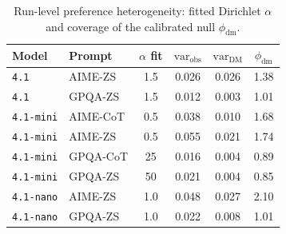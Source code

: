 \documentclass{article}
\begin{document}
\begin{table}[H]
\centering
\caption{Run-level preference heterogeneity: fitted Dirichlet $\alpha$ and coverage of the calibrated null $\phi_{\mathrm{dm}}$.}
\label{tab:dispersion}
\begin{tabular}{llcccc}
\toprule
Model & Prompt & $\alpha$ fit & $\mathrm{var}_{\mathrm{obs}}$ &
$\mathrm{var}_{\mathrm{DM}}$ & $\phi_{\mathrm{dm}}$ \\
\midrule
\texttt{4.1} & AIME-ZS & 1.5 & 0.026 & 0.026 & 1.38 \\
\texttt{4.1} & GPQA-ZS & 1.5 & 0.012 & 0.003 & 1.01 \\
\texttt{4.1-mini} & AIME-CoT & 0.5 & 0.038 & 0.010 & 1.68 \\
\texttt{4.1-mini} & AIME-ZS & 0.5 & 0.055 & 0.021 & 1.74 \\
\texttt{4.1-mini} & GPQA-CoT & 25 & 0.016 & 0.004 & 0.89 \\
\texttt{4.1-mini} & GPQA-ZS & 50 & 0.021 & 0.004 & 0.85 \\
\texttt{4.1-nano} & AIME-ZS & 1.0 & 0.048 & 0.027 & 2.10 \\
\texttt{4.1-nano} & GPQA-ZS & 1.0 & 0.022 & 0.008 & 1.01 \\
\bottomrule
\end{tabular}
\end{table}
\end{document}
